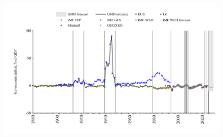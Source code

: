 \documentclass[12pt,a4paper,landscape]{article}
\begin{document}
\begin{adjustbox}{max totalsize={\paperwidth}{\paperheight},center}
\begin{minipage}[t][\textheight][t]{\textwidth}
\begin{table}[H]
\end{table}
\begin{figure}[H]
\centering
\includegraphics[width=\textwidth,height=0.6\textheight,keepaspectratio]{graphs/NLD_govdef_GDP.pdf}
\end{figure}
\end{minipage}
\end{adjustbox}
\end{document}
